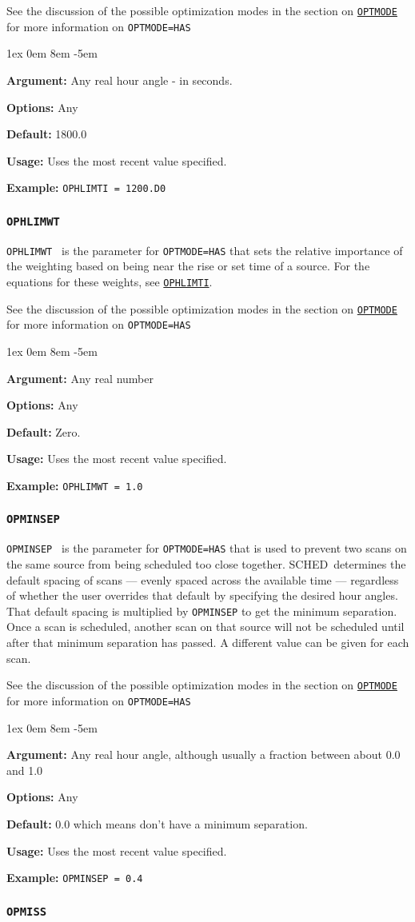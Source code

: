 \documentclass{report}
\newcommand{\schedb}{{\sc SCHED~}}
\newcommand{\rcwbox}[5]{
  \begin{list}{}{\parsep 1ex  \itemsep 0em
                 \leftmargin 8em  \itemindent -5em }
    \item {\bf Argument:} #1
    \item {\bf Options:}  #2
    \item {\bf Default:}  #3
    \item {\bf Usage:}    #4
    \item {\bf Example:}  #5
  \end{list}
}
\begin{document}
See the discussion of the possible optimization modes in the section
on 
{\hyperref[MP:OPTMODE]{{\tt OPTMODE}}} for more information on
{\tt OPTMODE=HAS}

\rcwbox
{Any real hour angle - in seconds.}
{Any}
{1800.0}
{Uses the most recent value specified.}
{{\tt OPHLIMTI = 1200.D0}}

\subsubsection{\label{MP:OPHLIMWT}{\tt OPHLIMWT}}

{\tt OPHLIMWT } is the parameter for {\tt OPTMODE=HAS} that sets the
relative importance of the weighting based on being near the
rise or set time of a source.  For the equations
for these weights, see 
{\hyperref[MP:OPHLIMTI]{{\tt OPHLIMTI}}}.

See the discussion of the possible optimization modes in the section
on 
{\hyperref[MP:OPTMODE]{{\tt OPTMODE}}} for more information on
{\tt OPTMODE=HAS}

\rcwbox
{Any real number}
{Any}
{Zero.}
{Uses the most recent value specified.}
{{\tt OPHLIMWT = 1.0 }}

\subsubsection{\label{MP:OPMINSEP}{\tt OPMINSEP}}

{\tt OPMINSEP } is the parameter for {\tt OPTMODE=HAS} that is used
to prevent two scans on the same source from being scheduled too close
together.  \schedb determines the default spacing of scans --- evenly
spaced across the available time --- regardless of whether the user
overrides that default by specifying the desired hour angles.  That
default spacing is multiplied by {\tt OPMINSEP} to get the minimum
separation.  Once a scan is scheduled,
another scan on that source will not be scheduled until after that
minimum separation has passed.  A different value can be given for
each scan.

See the discussion of the possible optimization modes in the section
on 
{\hyperref[MP:OPTMODE]{{\tt OPTMODE}}} for more information on
{\tt OPTMODE=HAS}

\rcwbox
{Any real hour angle, although usually a fraction between about 0.0 and 1.0}
{Any}
{0.0 which means don't have a minimum separation.}
{Uses the most recent value specified.}
{{\tt OPMINSEP = 0.4}}

\subsubsection{\label{MP:OPMISS}{\tt OPMISS}}
\end{document}
